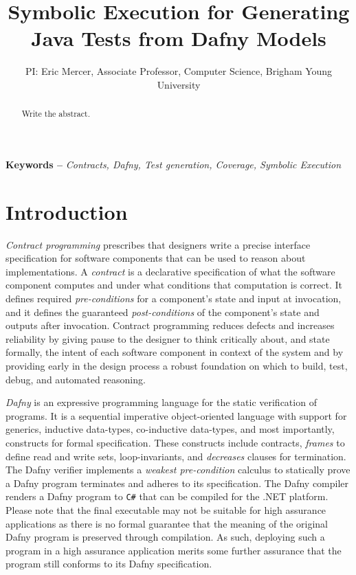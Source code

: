 \documentclass[11pt,onecolumn,notitlepage]{article}
\begin{document}
\title{Symbolic Execution for Generating Java Tests from Dafny Models}
\author{PI: Eric Mercer, Associate Professor, Computer Science, Brigham Young University}
\maketitle

\begin{abstract}
  Write the abstract.
\end{abstract}

\providecommand{\keywords}[1]{\noindent\textbf{Keywords -- } \textit{#1}}
\keywords{Contracts, Dafny, Test generation, Coverage, Symbolic Execution}

\section*{Introduction}
\emph{Contract programming} prescribes that designers write a precise interface specification for software components that can be used to reason about implementations. A \emph{contract} is a declarative specification of what the software component computes and under what conditions that computation is correct. It defines required \emph{pre-conditions} for a component's state and input at invocation, and it defines the guaranteed \emph{post-conditions} of the component's state and outputs after invocation. Contract programming reduces defects and increases reliability by giving pause to the designer to think critically about, and state formally, the intent of each software component in context of the system and by providing early in the design process a robust foundation on which to build, test, debug, and automated reasoning. 

\emph{Dafny} is an expressive programming language for the static verification of programs. It is a sequential imperative object-oriented language with support for generics, inductive data-types, co-inductive data-types, and most importantly, constructs for formal specification. These constructs include contracts, \emph{frames} to define read and write sets, loop-invariants, and \emph{decreases} clauses for termination. The Dafny verifier implements a \emph{weakest pre-condition} calculus to statically prove a Dafny program terminates and adheres to its specification. The Dafny compiler renders a Dafny program to \texttt{C\#} that can be compiled for the .NET platform. Please note that the final executable may not be suitable for high assurance applications as there is no formal guarantee that the meaning of the original Dafny program is preserved through compilation. As such, deploying such a program in a high assurance application merits some further assurance that the program still conforms to its Dafny specification.  
\end{document}
